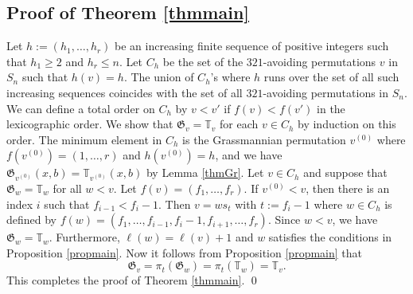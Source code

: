 \documentclass[11pt,reqno,sumlimits]{amsart}
\newcommand{\bbT}{{\mathbb T}}
\newcommand{\frakG}{{\mathfrak G}}
\theoremstyle{definition}
\numberwithin{equation}{section}
\begin{document}
\subsection{Proof of Theorem \ref{thmmain}}
Let $h:=(h_1,\dots, h_r)$ be an increasing finite sequence of positive integers such that $h_1\geq 2$ and $h_r\leq n$. Let $C_h$ be the set of the $321$-avoiding permutations $v$ in $S_n$ such that $h(v)=h$. The union of $C_h$'s where $h$ runs over the set of all such increasing sequences coincides with the set of all $321$-avoiding permutations in $S_n$. We can define a total order on $C_h$ by $v < v'$ if $f(v)<f(v')$ in the lexicographic order. We show that $\frakG_v= \bbT_v$ for each $v\in C_h$ by induction on this order. The minimum element in $C_h$ is the Grassmannian permutation $v^{(0)}$ where $f(v^{(0)})=(1,\dots, r)$ and $h(v^{(0)}) = h$, and we have $\frakG_{v^{(0)}}(x,b) = \bbT_{v^{(0)}}(x,b)$ by Lemma \ref{thmGr}. Let $v\in C_h$ and suppose that $\frakG_w=\bbT_w$ for all $w < v$. Let $f(v)=(f_1,\dots, f_r)$. If $v^{(0)}<v$, then there is an index $i$ such that $f_{i-1}<f_{i}-1$. Then $v=ws_t$ with $t:=f_i -1$ where $w \in C_h$ is defined by $f(w)=(f_1,\dots, f_{i-1}, f_i-1, f_{i+1},\dots, f_r)$. Since $w<v$, we have $\frakG_w=\bbT_w$. Furthermore, $\ell(w)=\ell(v)+1$ and $w$ satisfies the conditions in Proposition \ref{propmain}. Now it follows from Proposition \ref{propmain} that
\[
\frakG_v = \pi_t(\frakG_w) = \pi_t(\bbT_w) = \bbT_v.
\]
This completes the proof of Theorem \ref{thmmain}.
\qed
\end{document}

